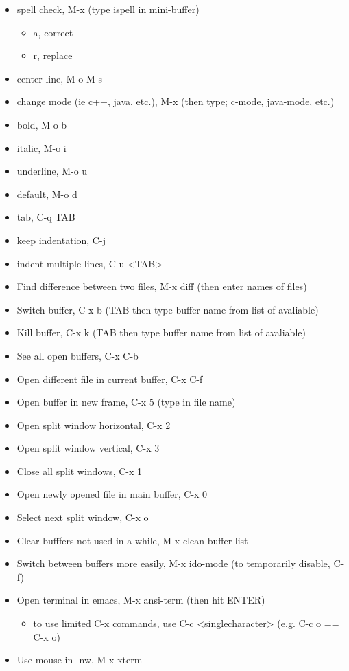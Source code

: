 \documentclass[11pt]{article}
\begin{document}
\begin{itemize}
\item spell check, M-x (type ispell in mini-buffer)
\begin{itemize}
\item a, correct
\item r, replace
\end{itemize}
\item center line, M-o M-s
\item change mode (ie c++, java, etc.), M-x (then type; c-mode, java-mode, etc.)
\item bold, M-o b
\item italic, M-o i
\item underline, M-o u
\item default, M-o d
\item tab, C-q TAB
\item keep indentation, C-j
\item indent multiple lines, C-u <TAB>
\item Find difference between two files, M-x diff (then enter names of files)
\item Switch buffer, C-x b (TAB then type buffer name from list of avaliable)
\item Kill buffer, C-x k  (TAB then type buffer name from list of avaliable)
\item See all open buffers, C-x C-b
\item Open different file in current buffer, C-x C-f
\item Open buffer in new frame, C-x 5 (type in file name)
\item Open split window horizontal, C-x 2
\item Open split window vertical, C-x 3
\item Close all split windows, C-x 1
\item Open newly opened file in main buffer, C-x 0
\item Select next split window, C-x o
\item Clear bufffers not used in a while, M-x clean-buffer-list
\item Switch between buffers more easily, M-x ido-mode (to temporarily disable, C-f)
\item Open terminal in emacs, M-x ansi-term (then hit ENTER)
\begin{itemize}
\item to use limited C-x commands, use C-c <singlecharacter> (e.g. C-c o == C-x o)
\end{itemize}
\item Use mouse in -nw, M-x xterm

\end{itemize}
\end{document}
